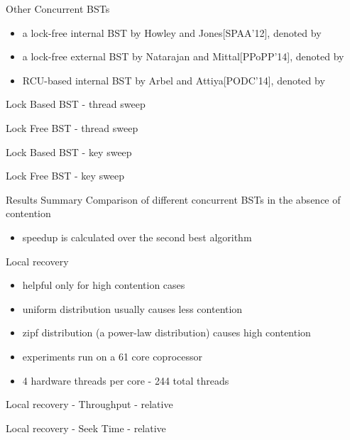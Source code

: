 \begin{frame}{Other Concurrent BSTs}
\begin{itemize}
\item a lock-free internal BST by Howley and Jones[SPAA'12], denoted by \HJBST{}
\item a lock-free external BST by Natarajan and Mittal[PPoPP'14], denoted by \NMBST{}
\item RCU-based internal BST by Arbel and Attiya[PODC'14], denoted by \CITRUS{} 
\end{itemize}
\end{frame}

\begin{frame}{Lock Based BST - thread sweep}

\end{frame}
\begin{frame}{Lock Free BST - thread sweep}

\end{frame}

\begin{frame}{Lock Based BST - key sweep}
%

\end{frame}
\begin{frame}{Lock Free BST - key sweep}
%

\end{frame}

%
%

\begin{frame}{Results Summary}
Comparison of different concurrent BSTs in the absence of contention
\ifdefined\LONG

\pause
\fi
\begin{itemize}
\item speedup is calculated over the second best algorithm
\end{itemize}

\end{frame}

\begin{frame}{Local recovery}
\begin{itemize}
\item helpful only for high contention cases
\item uniform distribution usually causes less contention
\item zipf distribution (a power-law distribution) causes high contention
\item experiments run on a 61 core coprocessor
\item 4 hardware threads per core - 244 total threads
\end{itemize}
\end{frame}

\begin{frame}{Local recovery - Throughput - relative}

\end{frame}

\begin{frame}{Local recovery - Seek Time - relative}

\end{frame}